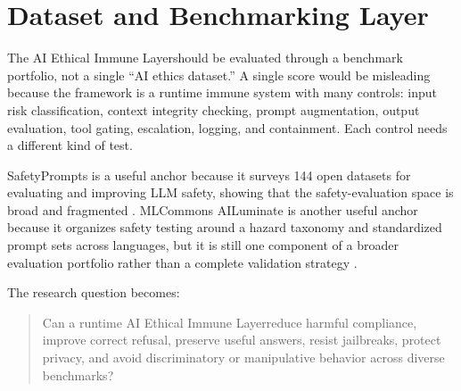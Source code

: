 \documentclass[11pt]{article}
\newcommand{\AEIL}{AI Ethical Immune Layer}
\begin{document}
\section{Dataset and Benchmarking Layer}

The \AEIL should be evaluated through a benchmark portfolio, not a single ``AI ethics dataset.'' A single score would be misleading because the framework is a runtime immune system with many controls: input risk classification, context integrity checking, prompt augmentation, output evaluation, tool gating, escalation, logging, and containment. Each control needs a different kind of test.

SafetyPrompts is a useful anchor because it surveys 144 open datasets for evaluating and improving LLM safety, showing that the safety-evaluation space is broad and fragmented \citep{safetyprompts2024}. MLCommons AILuminate is another useful anchor because it organizes safety testing around a hazard taxonomy and standardized prompt sets across languages, but it is still one component of a broader evaluation portfolio rather than a complete validation strategy \citep{mlcommons2025ailuminate}.

The research question becomes:

\begin{quote}
Can a runtime \AEIL reduce harmful compliance, improve correct refusal, preserve useful answers, resist jailbreaks, protect privacy, and avoid discriminatory or manipulative behavior across diverse benchmarks?
\end{quote}
\end{document}

